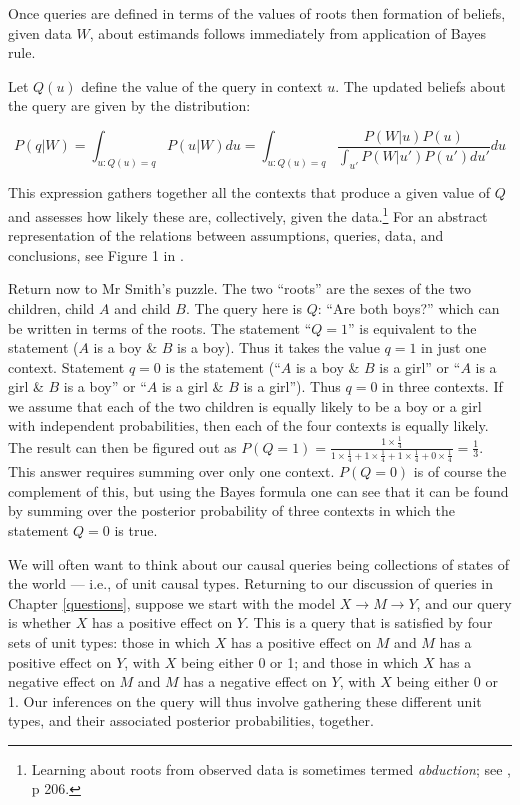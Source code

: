 \documentclass[12pt,]{book}
\let\rmarkdownfootnote\footnote%
\def\footnote{\protect\rmarkdownfootnote}
\begin{document}
Once queries are defined in terms of the values of roots then formation of beliefs, given data \(W\), about estimands follows immediately from application of Bayes rule.

Let \(Q(u)\) define the value of the query in context \(u\). The updated beliefs about the query are given by the distribution:

\[P(q | W) = \int_{u:Q(u) = q} P(u|W)du =  \int_{u:Q(u) = q} \frac{P(W|u)P(u)}{\int_{u'}P(W|u')P(u')du'}du\]

This expression gathers together all the contexts that produce a given value of \(Q\) and assesses how likely these are, collectively, given the data.\footnote{Learning about roots from observed data is sometimes termed \emph{abduction}; see \citet{pearl2009causality}, p 206.} For an abstract representation of the relations between assumptions, queries, data, and conclusions, see Figure 1 in \citet{pearl2012causal}.

Return now to Mr Smith's puzzle. The two ``roots'' are the sexes of the two children, child \(A\) and child \(B\). The query here is \(Q\): ``Are both boys?'' which can be written in terms of the roots. The statement ``\(Q=1\)'' is equivalent to the statement (\(A\) is a boy \& \(B\) is a boy). Thus it takes the value \(q=1\) in just one context. Statement \(q=0\) is the statement (``\(A\) is a boy \& \(B\) is a girl'' or ``\(A\) is a girl \& \(B\) is a boy'' or ``\(A\) is a girl \& \(B\) is a girl''). Thus \(q=0\) in three contexts. If we assume that each of the two children is equally likely to be a boy or a girl with independent probabilities, then each of the four contexts is equally likely.
The result can then be figured out as \(P(Q=1) = \frac{1\times \frac{1}{4}}{1\times \frac{1}{4} + 1\times \frac{1}{4}+1\times \frac{1}{4}+0\times \frac{1}{4}} = \frac{1}{3}\). This answer requires summing over only one context. \(P(Q=0)\) is of course the complement of this, but using the Bayes formula one can see that it can be found by summing over the posterior probability of three contexts in which the statement \(Q=0\) is true.

We will often want to think about our causal queries being collections of states of the world --- i.e., of unit causal types. Returning to our discussion of queries in Chapter \ref{questions}, suppose we start with the model \(X \rightarrow M \rightarrow Y\), and our query is whether \(X\) has a positive effect on \(Y\). This is a query that is satisfied by four sets of unit types: those in which \(X\) has a positive effect on \(M\) and \(M\) has a positive effect on \(Y\), with \(X\) being either 0 or 1; and those in which \(X\) has a negative effect on \(M\) and \(M\) has a negative effect on \(Y\), with \(X\) being either 0 or 1. Our inferences on the query will thus involve gathering these different unit types, and their associated posterior probabilities, together.
\end{document}
